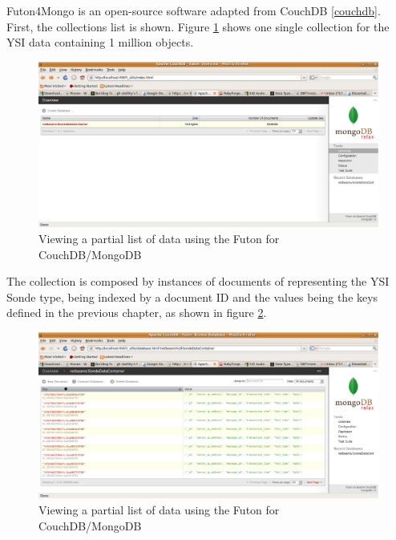Futon4Mongo is an open-source software adapted from CouchDB \ref{couchdb}.
First, the collections list is shown. Figure
\ref{fig:view-collections-instance-browser-futondb} shows one single collection
for the YSI data containing 1 million objects.

\begin{figure}[h]
  \centering
  \includegraphics[scale=0.3]{../diagrams/view-collections-instance-browser-futondb}
  \caption{Viewing a partial list of data using the Futon for CouchDB/MongoDB}
  \label{fig:view-collections-instance-browser-futondb}
\end{figure}

The collection is composed by instances of documents of representing the YSI
Sonde type, being indexed by a document ID and the values being the keys
defined in the previous chapter, as shown in figure
\ref{fig:view-collected-data-list-browser-futondb}.

\begin{figure}[h]
  \centering
  \includegraphics[scale=0.3]{../diagrams/view-collected-data-list-browser-futondb}
  \caption{Viewing a partial list of data using the Futon for CouchDB/MongoDB}
  \label{fig:view-collected-data-list-browser-futondb}
\end{figure}

